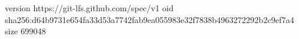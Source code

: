 version https://git-lfs.github.com/spec/v1
oid sha256:d64b9731e654fa33d53a7742fab9ea055983e32f7838b4963272292b2c9ef7a4
size 699048
